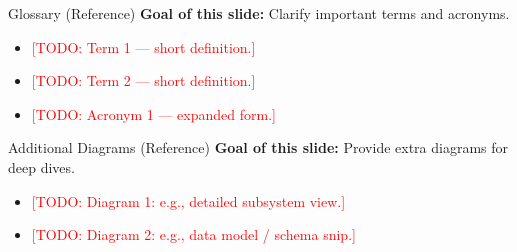 \documentclass[aspectratio=169]{beamer}
\newcommand{\TODO}[1]{\textcolor{red}{[TODO: #1]}}
\begin{document}
\begin{frame}{Glossary (Reference)}
  \textbf{Goal of this slide:} Clarify important terms and acronyms.

  \begin{itemize}
    \item \TODO{Term 1 --- short definition.}
    \item \TODO{Term 2 --- short definition.}
    \item \TODO{Acronym 1 --- expanded form.}
  \end{itemize}
\end{frame}

\begin{frame}{Additional Diagrams (Reference)}
  \textbf{Goal of this slide:} Provide extra diagrams for deep dives.

  \begin{itemize}
    \item \TODO{Diagram 1: e.g., detailed subsystem view.}
    \item \TODO{Diagram 2: e.g., data model / schema snip.}
  \end{itemize}
\end{frame}

\end{document}
